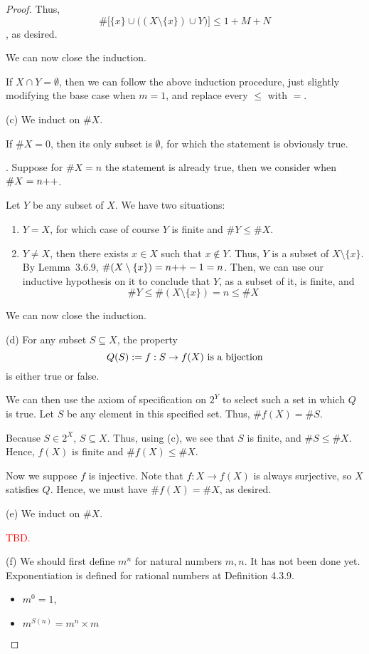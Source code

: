 \begin{proof}
	Thus,
	\[
		\#\biggl[\{x\} \cup \bigl((X \setminus \{x\}) \cup Y\bigr)\biggr] \le 1+M+N
	\]
	, as desired.
	
	We can now close the induction.
	
	If $X \cap Y = \emptyset$, then we can follow the above induction procedure, just slightly modifying the base case when $m = 1$, and replace every $\le$ with $=$.
	
(c)
	 We induct on $\#X$.
	
	\mybcbox If $\#X = 0$, then its only subset is $\emptyset$, for which the statement is obviously true.
	
	\myisbox. Suppose for $\#X = n$ the statement is already true, then we consider when $\#X = n{+}{+}$.
	
	Let $Y$ be any subset of $X$. We have two situations:
	\begin{enumerate}
		\item $Y = X$, for which case of course $Y$ is finite and $\#Y \le \#X$.
		\item $Y \ne X$, then there exists $x \in X$ such that $x \notin Y$. Thus, $Y$ is a subset of $X \setminus \{x\}$. By Lemma~3.6.9, $\#(X \setminus \{x\}) = n{+}{+}-1 = n$. Then, we can use our inductive hypothesis on it to conclude that $Y$, as a subset of it, is finite, and
		\[
			\#Y \le \#(X \setminus \{x\}) = n \le \#X
		\]
	\end{enumerate}

	We can now close the induction.
	
(d)
	For any subset $S \subseteq X$, the property 
	\[
		Q(S) := f: S \to f(X) \hbox{ is a bijection}
	\]
	is either true or false.
	
	We can then use the axiom of specification on $2^Y$ to select such a set in which $Q$ is true. Let $S$ be any element in this specified set. Thus, $\#f(X) = \#S$.
	
	Because $S \in 2^X$, $S \subseteq X$. Thus, using (c), we see that $S$ is finite, and $\#S \le \#X$. Hence, $f(X)$ is finite and $\#f(X) \le \#X$.
	
	Now we suppose $f$ is injective. Note that $f: X \to f(X)$ is always surjective, so $X$ satisfies $Q$. Hence, we must have $\#f(X) = \#X$, as desired.

(e)
	We induct on $\#X$.
 	
 	\textcolor{red}{TBD.}
 	
(f)
We should first define $m^n$ for natural numbers $m,n$. It has not been done yet. Exponentiation is 
defined for rational numbers at Definition 4.3.9.
\begin{defn}
\begin{itemize}
\item $m^0=1$,
\item $m^{S(n)} = m^n \times m$
\end{itemize}
\end{defn}


\end{proof}
